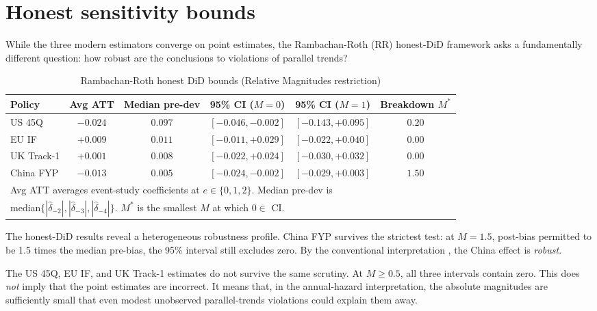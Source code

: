 \section{Honest sensitivity bounds}
\label{sec:honest_did}

While the three modern estimators converge on point estimates, the Rambachan-Roth (RR) honest-DiD framework asks a fundamentally different question: how robust are the conclusions to violations of parallel trends?

\begin{table}[h]
\centering
\caption{Rambachan-Roth honest DiD bounds (Relative Magnitudes restriction)}
\label{tab:honest_did}
\begin{tabular}{lccccc}
\toprule
Policy & Avg ATT & Median pre-dev & 95\% CI ($M=0$) & 95\% CI ($M=1$) & Breakdown $M^*$ \\
\midrule
US 45Q       & $-0.024$ & $0.097$ & $[-0.046, -0.002]$ & $[-0.143, +0.095]$ & $0.20$ \\
EU IF        & $+0.009$ & $0.011$ & $[-0.011, +0.029]$ & $[-0.022, +0.040]$ & $0.00$ \\
UK Track-1   & $+0.001$ & $0.008$ & $[-0.022, +0.024]$ & $[-0.030, +0.032]$ & $0.00$ \\
China FYP    & $-0.013$ & $0.005$ & $[-0.024, -0.002]$ & $[-0.029, +0.003]$ & $\mathbf{1.50}$ \\
\bottomrule
\multicolumn{6}{l}{\footnotesize Avg ATT averages event-study coefficients at $e \in \{0,1,2\}$. Median pre-dev is} \\
\multicolumn{6}{l}{\footnotesize median$\{|\hat{\delta}_{-2}|, |\hat{\delta}_{-3}|, |\hat{\delta}_{-4}|\}$. $M^*$ is the smallest $M$ at which $0 \in$ CI.} \\
\end{tabular}
\end{table}

The honest-DiD results reveal a heterogeneous robustness profile. China FYP survives the strictest test: at $M = 1.5$, post-bias permitted to be 1.5 times the median pre-bias, the 95\% interval still excludes zero. By the conventional interpretation \cite{rambachan2023more}, the China effect is \emph{robust}.

The US 45Q, EU IF, and UK Track-1 estimates do not survive the same scrutiny. At $M \geq 0.5$, all three intervals contain zero. This does \emph{not} imply that the point estimates are incorrect. It means that, in the annual-hazard interpretation, the absolute magnitudes are sufficiently small that even modest unobserved parallel-trends violations could explain them away.

